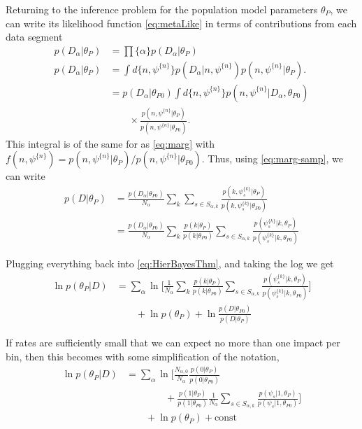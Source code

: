 \documentclass[twocolumn,showpacs,aps,prd,nobibnotes,nofootinbib,floatfix]{revtex4-1}
\begin{document}
Returning to the inference problem for the population model parameters $\theta_P$, we can write its likelihood function \eqref{eq:metaLike} in terms of contributions from each data segment
\begin{align*}
  p(D_\alpha|\theta_P)&=\prod{\{\alpha\}} p(D_\alpha|\theta_P)\\
  p(D_\alpha|\theta_P)&=\int d\{n,\psi^{\{n\}}\} p(D_\alpha|n,\psi^{\{n\}})p(n,\psi^{\{n\}}|\theta_P).\\
  &=p(D_\alpha|\theta_{P0})\int d\{n,\psi^{\{n\}}\} p(n,\psi^{\{n\}}|D_\alpha,\theta_{P0})\nonumber\\
  &\qquad\times\frac{p(n,\psi^{\{n\}}|\theta_P)}{p(n,\psi^{\{n\}}|\theta_{P0})}.
\end{align*}
This integral is of the same for as \eqref{eq:marg} with $f(n,\psi^{\{n\}})={p(n,\psi^{\{n\}}|\theta_P)}/{p(n,\psi^{\{n\}}|\theta_{P0})}$. Thus, using \eqref{eq:marg-samp}, we can write
\begin{align}
  p(D|\theta_P)&=\frac{p(D_\alpha|\theta_{P0})}{N_\alpha}\sum_k\sum_{s\in S_{\alpha,k}}\frac{p(k,\psi_s^{\{k\}}|\theta_P)}{p(k,\psi_s^{\{k\}}|\theta_{P0})}\nonumber\\
  &=\frac{p(D_\alpha|\theta_{P0})}{N_\alpha}\sum_k\frac{p(k|\theta_P)}{p(k|\theta_{P0})}\sum_{s\in S_{\alpha,k}}\frac{p(\psi_s^{\{k\}}|k,\theta_P)}{p(\psi_s^{\{k\}}|k,\theta_{P0})}
\end{align}

Plugging everything back into \eqref{eq:HierBayesThm}, and taking the log we get
\begin{align}
  \ln p(\theta_P|D)&= \sum_\alpha\ln\Big[ \frac1{N_\alpha}\sum_k\frac{p(k|\theta_P)}{p(k|\theta_{P0})}\sum_{s\in S_{\alpha,k}}\frac{p(\psi_s^{\{k\}}|k,\theta_P)}{p(\psi_s^{\{k\}}|k,\theta_{P0})}\Big]\nonumber\\
  &\qquad+\ln p(\theta_P)+\ln\frac{p(D|\theta_{P0})}{p(D|\theta_P)}
\end{align}

If rates are sufficiently small that we can expect no more than one impact per bin, then this becomes with some simplification of the notation,
\begin{align}
  \ln p(\theta_P|D)&= \sum_\alpha\ln\Big[ \frac{N_{\alpha,0}}{N_\alpha}\frac{p(0|\theta_P)}{p(0|\theta_{P0})}\nonumber\\
    &\qquad\qquad+\frac{p(1|\theta_P)}{p(1|\theta_{P0})}\frac1{N_{\alpha}}\sum_{s\in S_{\alpha,k}}\frac{p(\psi_s|1,\theta_P)}{p(\psi_s|1,\theta_{P0})}\Big]\nonumber\\
  &\qquad+\ln p(\theta_P)+\mathrm{const}\label{eq:HierPost}
\end{align}
\end{document}
